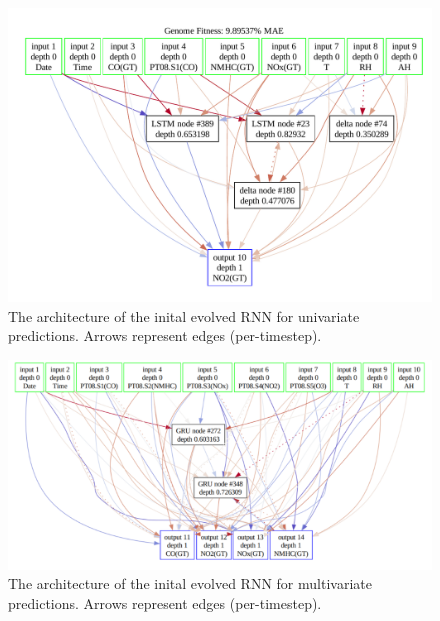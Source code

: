 \documentclass[12pt]{article}
\begin{document}
\begin{figure}
    \includegraphics[width=\linewidth]{resources/init_genome.png}
    \caption{The architecture of the inital evolved RNN for univariate predictions. Arrows represent edges (per-timestep).}
\end{figure}

\begin{figure}
    \includegraphics[width=\linewidth]{resources/init_genome_mv0.png}
    \caption{The architecture of the inital evolved RNN for multivariate predictions. Arrows represent edges (per-timestep).}
\end{figure}
\end{document}
